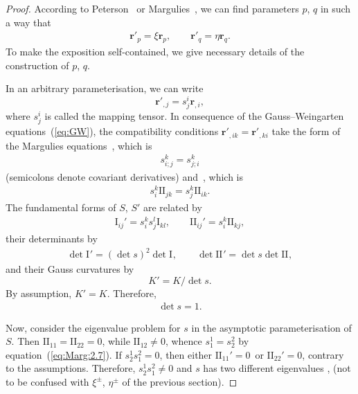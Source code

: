 \documentclass[pdftex]{sigma}
\let\ve\mathbf
\def\I#1#2{\mathrm{I}_{#1#2}}
\def\II#1#2{\mathrm{II}_{#1#2}}
\def\eqref#1{{\rm(\ref{#1})}}
\numberwithin{equation}{section}
\begin{document}
\begin{proof}
According to Peterson~\cite[Theorem~4]{KMP-1866} or
Margulies~\cite[Theorem~4.1]{GM-1961}, we can find parameters $p$, $q$
in such a way that
\begin{gather}\label{eq:parallel}
\ve r'_p = \xi \ve r_p, \qquad
\ve r'_q = \eta \ve r_q.
\end{gather}
To make the exposition self-contained, we give necessary details of the construction
of $p$, $q$.

In an arbitrary parameterisation, we can write
\[
\ve r'_{,j} = s^i_j \ve r_{,i},
\]
where $s^i_j$ is called the mapping tensor.
In consequence of the Gauss--Weingarten equations~\eqref{eq:GW},
the compatibility conditions $\ve r'_{,ik} = \ve r'_{,ki}$ take
the form of the Margulies equations~\cite[equation~(2.6)]{GM-1961}, which is
\begin{gather}\label{eq:Marg:2.6}
s^k_{i;j} = s^k_{j;i}
\end{gather}
(semicolons denote covariant derivatives) and~\cite[equation~(2.7)]{GM-1961},
which is
\begin{gather}\label{eq:Marg:2.7}
s^k_i \II jk = s^k_j \II ik.
\end{gather}
The fundamental forms of $S$, $S'$ are related by
\begin{gather}\label{eq:Marg:ff}
\I ij' = s^k_i s^l_j \I kl,
\qquad
\II ij' = s^k_i \II kj,
\end{gather}
their determinants by
\begin{gather} \label{eq:Marg:ff:det}
\det\I{}{}' = (\det s)^2 \det\I{}{},
\qquad
\det\II{}{}' = \det s \det\II{}{},
\end{gather}
and their Gauss curvatures by
\[
K' = K/{\det s}.
\]
By assumption, $K' = K$. Therefore,
\begin{gather} \label{eq:Marg:det:1}
\det s = 1.
\end{gather}

Now, consider the eigenvalue problem for $s$ in the asymptotic parameterisation of $S$.
Then
$\II 11 = \II 22 = 0$, while $\II 12 \ne 0$, whence $s^1_1 = s^2_2$
by equation~\eqref{eq:Marg:2.7}.
If $s^1_2 s^2_1 = 0$, then either ${\II 11' = 0}$ or $\II 22' = 0$,
contrary to the assumptions.
Therefore, $s^1_2 s^2_1 \ne 0$ and $s$ has two different eigenvalues
,
(not to be confused with $\xi^\pm$, $\eta^\pm$ of the previous section).


\end{proof}
\end{document}

